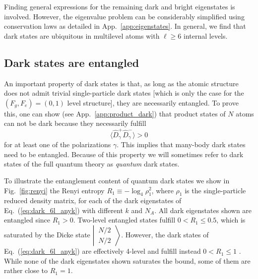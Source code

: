 \documentclass[aps,prx,superscriptaddress,twocolumn,notitlepage,nofootinbib,longbibliography]{revtex4-2}
\begin{document}
Finding general expressions for the remaining dark and bright eigenstates is involved. However, the eigenvalue problem can be considerably simplified using conservation laws as detailed in App.~\ref{app:eigenstates}. In general, we find that dark states are ubiquitous in multilevel atoms with $\ell\geq6$ internal levels.







\subsection{Dark states are entangled\label{ssec:dark_entangled}}

An important property of dark states is that, as long as the atomic structure does not admit trivial single-particle dark states [which is only the case for the $(F_g,F_e)=(0,1)$ level structure], they are necessarily entangled.
To prove this, one can show (see App.~\ref{app:product_dark}) that product states of $N$ atoms can not be dark because they necessarily fulfill
\begin{equation}
    \langle \hat{D}^+_\gamma \hat{D}^-_\gamma \rangle > 0
\label{eq:DD_bigger_zero}
\end{equation}
for at least one of the polarizations $\gamma$.
This implies that many-body dark states need to be entangled.
Because of this property we will sometimes refer to dark states of the full quantum theory as \emph{quantum} dark states.

To illustrate the entanglement content of quantum dark states we show in Fig.~\ref{fig:renyi} the Renyi entropy $R_1\equiv-\log_4\rho_1^2$, where $\rho_1$ is the single-particle reduced density matrix, for each of the dark eigenstates of Eq.~(\ref{eq:dark_6l_anyk}) with different $k$ and $N_A$.
All dark eigenstates shown are entangled since $R_1>0$.
Two-level entangled states fulfill $0<R_1\leq 0.5$, which is saturated by the Dicke state $\left|\, \begin{smallmatrix} N/2 \\ N/2 \end{smallmatrix} \,\right\rangle$. However, the dark states of Eq.~(\ref{eq:dark_6l_anyk}) are effectively 4-level and fulfill instead $0<R_1\leq1$ . While none of the dark eigenstates shown saturates the bound, some of them are rather close to $R_1=1$.
\end{document}
